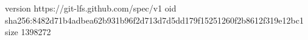version https://git-lfs.github.com/spec/v1
oid sha256:8482d71b4adbea62b931b96f2d713d7d5dd179f15251260f2b8612f319e12bc1
size 1398272
